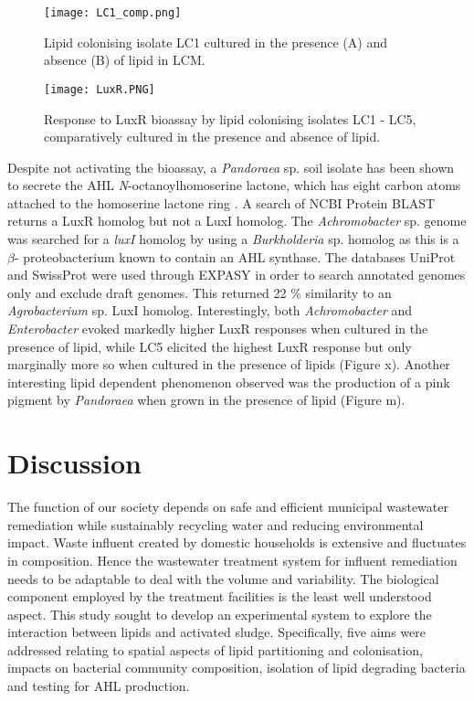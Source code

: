 \documentclass[twoside]{article}
\begin{document}
\begin{figure}
\texttt{[image: LC1\_comp.png]}
\caption{Lipid colonising isolate LC1 cultured in the presence (A) and absence (B) of lipid in LCM.}
\end{figure}

\begin{figure}
\texttt{[image: LuxR.PNG]}
\caption{Response to LuxR bioassay by lipid colonising isolates LC1 - LC5, comparatively cultured in the presence and absence of lipid.}
\end{figure}

Despite not activating the bioassay, a \emph{Pandoraea} sp. soil isolate has been shown to secrete the AHL \emph{N}-octanoylhomoserine lactone, which has eight carbon atoms attached to the homoserine lactone ring \cite{han2013pandoraea}. A search of NCBI Protein BLAST returns a LuxR homolog but not a LuxI homolog. The \emph{Achromobacter} sp. genome was searched for a \emph{luxI} homolog by using a \emph{Burkholderia} sp. homolog as  this is a \emph{$\beta$}- proteobacterium known to contain an AHL synthase. The databases UniProt and SwissProt were used through EXPASY in order to search annotated genomes only and exclude draft genomes. This returned  22 \% similarity to an \emph{Agrobacterium} sp. LuxI homolog.
Interestingly, both \emph{Achromobacter} and \emph{Enterobacter} evoked markedly higher LuxR responses when cultured in the presence of lipid, while LC5 elicited the highest LuxR response but only marginally more so when cultured in the presence of lipids (Figure x). Another interesting lipid dependent phenomenon observed was the production of a pink pigment by \emph{Pandoraea} when grown in the presence of lipid (Figure m).
\FloatBarrier    
 

\newpage
\section{Discussion}
\thispagestyle{plain}
The function of our society depends on safe and efficient municipal wastewater remediation while sustainably recycling water and reducing environmental impact. Waste influent created by domestic households is extensive and fluctuates in composition. Hence the wastewater treatment system for influent remediation needs to be adaptable to deal with the volume and variability. The biological component employed by the treatment facilities is the least well understood aspect. This study sought to develop an experimental system to explore the interaction between lipids and activated sludge. Specifically, five aims were addressed relating to spatial aspects of lipid partitioning and colonisation, impacts on bacterial community composition, isolation of lipid degrading bacteria and testing for AHL production.
\end{document}
